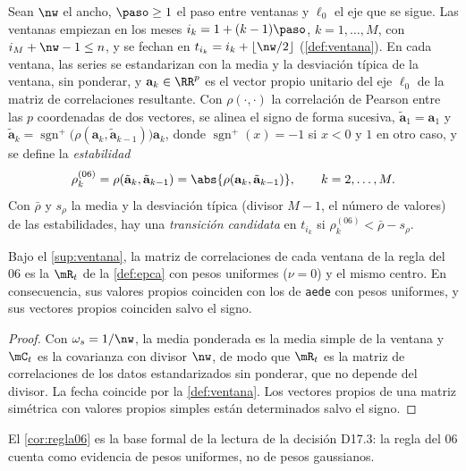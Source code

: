 \begin{definicion}\label{def:regla06}
Sean $\nw$ el ancho, $\paso\ge1$ el paso entre ventanas y $\ell_0$ el eje que se sigue. Las ventanas
empiezan en los meses $i_k=1+(k-1)\paso$, $k=1,\dots,M$, con $i_M+\nw-1\le n$, y se fechan en
$t_{i_k}=i_k+\lfloor\nw/2\rfloor$ (\cref{def:ventana}). En cada ventana, las series se estandarizan
con la media y la desviación típica de la ventana, sin ponderar, y $\mathbf{a}_k\in\RR^p$ es el
vector propio unitario del eje $\ell_0$ de la matriz de correlaciones resultante. Con $\rho(\cdot,
\cdot)$ la correlación de Pearson entre las $p$ coordenadas de dos vectores, se alinea el signo de
forma sucesiva, $\tilde{\mathbf{a}}_1=\mathbf{a}_1$ y
$\tilde{\mathbf{a}}_k=\operatorname{sgn}^{+}\!\bigl(\rho(\mathbf{a}_k,\tilde{\mathbf{a}}_{k-1})\bigr)
\mathbf{a}_k$, donde $\operatorname{sgn}^{+}(x)=-1$ si $x<0$ y $1$ en otro caso, y se define la
\emph{estabilidad}
\[
  \rho^{(06)}_k=\rho(\tilde{\mathbf{a}}_k,\tilde{\mathbf{a}}_{k-1})
  =\abs{\rho(\mathbf{a}_k,\tilde{\mathbf{a}}_{k-1})},\qquad k=2,\dots,M.
\]
Con $\bar\rho$ y $s_\rho$ la media y la desviación típica (divisor $M-1$, el número de valores) de
las estabilidades, hay una \emph{transición candidata} en $t_{i_k}$ si
$\rho^{(06)}_k<\bar\rho-s_\rho$.
\end{definicion}

\begin{corolario}\label{cor:regla06}
Bajo el \cref{sup:ventana}, la matriz de correlaciones de cada ventana de la regla del 06 es la
$\mR_t$ de la \cref{def:epca} con pesos uniformes ($\nu=0$) y el mismo centro. En consecuencia, sus
valores propios coinciden con los de \texttt{aede} con pesos uniformes, y sus vectores propios
coinciden salvo el signo.
\end{corolario}

\begin{proof}
Con $\omega_s=1/\nw$, la media ponderada es la media simple de la ventana y $\mC_t$ es la
covarianza con divisor $\nw$, de modo que $\mR_t$ es la matriz de correlaciones de los datos
estandarizados sin ponderar, que no depende del divisor. La fecha coincide por la
\cref{def:ventana}. Los vectores propios de una matriz simétrica con valores propios simples están
determinados salvo el signo.
\end{proof}

El \cref{cor:regla06} es la base formal de la lectura de la decisión D17.3: la regla del 06
cuenta como evidencia de pesos uniformes, no de pesos gaussianos.

